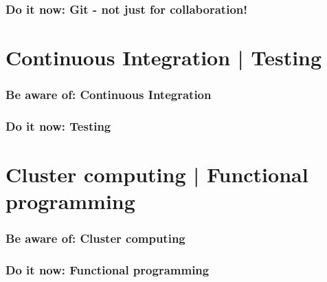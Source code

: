 \documentclass[10pt]{beamer}
\begin{document}
\begin{frame}[c]\frametitle{Do it now: Git - not just for collaboration!}



\end{frame}


\section{Continuous Integration | Testing}

\begin{frame}[c]\frametitle{Be aware of: Continuous Integration}



\end{frame}


\begin{frame}[c]\frametitle{Do it now: Testing}



\end{frame}




\section{Cluster computing | Functional programming}

\begin{frame}[c]\frametitle{Be aware of: Cluster computing}



\end{frame}


\begin{frame}[c]\frametitle{Do it now: Functional programming}



\end{frame}

\appendix
\end{document}
